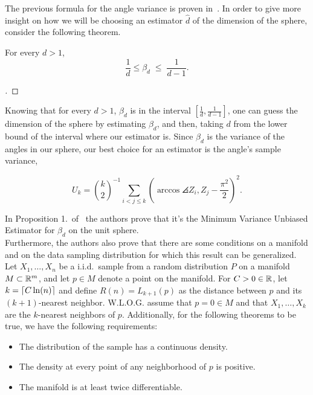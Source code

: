 The previous formula for the angle variance is proven in~\cite{diaz2019local}. In order to give more insight on how we will be choosing an estimator $\widehat{d}$ of the dimension of the sphere, consider the following theorem.

\begin{theorem}\label{ade:T1}
  For every $d > 1$,
  \[ \frac{1}{d} \leq \beta_d \;\leq\; \frac{1}{d-1}. \] 
\end{theorem}
\begin{proof}[]

\end{proof}

\vspace*{1em}

Knowing that for every $d > 1$, $\beta_d$ is in the interval $[\tfrac{1}{d}, \tfrac{1}{d-1}]$, one can guess the dimension of the sphere by estimating $\beta_d$, and then, taking $d$ from the lower bound of the interval where our estimator is. Since $\beta_d$ is the variance of the angles in our sphere, our best choice for an estimator is the angle's sample variance,


\begin{equation}\label{ade:2}
  U_{k} = \binom{k}{2}^{-1} \sum_{i<j\leq k}{\left(
    \arccos\angles{Z_i, Z_j} - \frac{\pi^2}{2} 
    \right)}^{2}.
\end{equation}

In Proposition 1.\ of~\cite{diaz2019local} the authors prove that it's the Minimum Variance Unbiased Estimator for $\beta_d$ on the unit sphere.\\[0.5 em]

Furthermore, the authors also prove that there are some conditions on a manifold and on the data sampling distribution for which this result can be generalized. Let $X_1,\ldots, X_n$ be a i.i.d.\ sample from a random distribution $P$ on a manifold $M \subset \mathbb{R}^m$, and let $p \in M$ denote a point on the manifold. For $C>0 \in  \mathbb{R}$, let $k = \left\lceil C \ln(n)\right\rceil$ and define $R(n) = L_{k+1}(p)$ as the distance between $p$ and its $(k+1)$-nearest neighbor. W.L.O.G. assume that $p = 0 \in M$ and that $X_1,\ldots, X_k$ are the $k$-nearest neighbors of $p$. Additionally, for the following theorems to be true, we have the following requirements:

\begin{itemize}
  \item The distribution of the sample has a continuous density.
  \item The density at every point of any neighborhood of $p$ is positive.
  \item The manifold is at least twice differentiable. 
\end{itemize}

